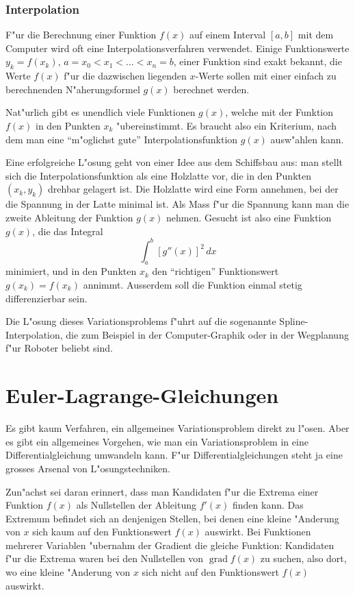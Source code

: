 \subsubsection{Interpolation}
F"ur die Berechnung einer Funktion $f(x)$ auf einem Interval
$[a,b]$ mit dem Computer wird oft eine Interpolationsverfahren verwendet.
Einige Funktionswerte $y_k=f(x_k)$, $a=x_0<x_1<\dots <x_n = b$,
einer Funktion sind exakt bekannt,
die Werte $f(x)$ f"ur die dazwischen liegenden $x$-Werte sollen
mit einer einfach zu berechnenden N"aherungsformel $g(x)$ berechnet
werden. 

Nat"urlich gibt es unendlich viele Funktionen $g(x)$, welche mit der
Funktion $f(x)$ in den Punkten $x_k$ "ubereinstimmt.
Es braucht also ein Kriterium, nach dem man eine ``m"oglichst gute''
Interpolationsfunktion $g(x)$ ausw"ahlen kann.

Eine erfolgreiche L"osung geht von einer Idee aus dem Schiffsbau aus:
man stellt sich die Interpolationsfunktion als eine Holzlatte vor, die
in den Punkten $(x_k,y_k)$ drehbar gelagert ist. Die Holzlatte wird
eine Form annehmen, bei der die Spannung in der Latte minimal ist.
Als Mass f"ur die Spannung kann man die zweite Ableitung der Funktion $g(x)$
nehmen. Gesucht ist also eine Funktion $g(x)$, die das Integral
\[
\int_a^b [g''(x)]^2\,dx
\]
minimiert, und in den Punkten $x_k$ den ``richtigen'' Funktionswert 
$g(x_k)=f(x_k)$ annimmt. Ausserdem soll die Funktion einmal stetig 
differenzierbar sein.

Die L"osung dieses Variationsproblems f"uhrt auf die sogenannte
Spline-Interpolation, die zum Beispiel in der Computer-Graphik oder
in der Wegplanung f"ur Roboter beliebt sind.

\section{Euler-Lagrange-Gleichungen}
Es gibt kaum Verfahren, ein allgemeines Variationsproblem direkt zu l"osen.
Aber es gibt ein allgemeines Vorgehen, wie man ein Variationsproblem
in eine Differentialgleichung umwandeln kann. F"ur Differentialgleichungen
steht ja eine grosses Arsenal von L"osungstechniken.

Zun"achst sei daran erinnert, dass man Kandidaten f"ur die Extrema einer
Funktion $f(x)$ als Nullstellen der Ableitung $f'(x)$ finden kann.
Das Extremum befindet sich an denjenigen Stellen, bei denen 
eine kleine "Anderung von $x$ sich kaum auf den Funktionswert
$f(x)$ auswirkt.
Bei Funktionen mehrerer Variablen "ubernahm der Gradient die gleiche
Funktion: Kandidaten f"ur die Extrema waren bei den Nullstellen
von $\operatorname{grad}f(x)$ zu suchen, also dort, wo eine kleine
"Anderung von $x$ sich nicht auf den Funktionswert $f(x)$ auswirkt.

